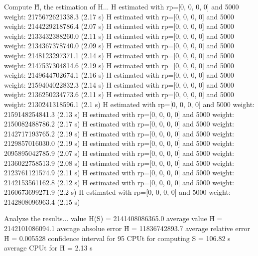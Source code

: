 Compute H̃, the estimation of H...
  H estimated with rp=[0, 0, 0, 0] and 5000 weight:  2175672621338.3  (2.17 s)
  H estimated with rp=[0, 0, 0, 0] and 5000 weight:  2144229218786.4  (2.07 s)
  H estimated with rp=[0, 0, 0, 0] and 5000 weight:  2133432388260.0  (2.11 s)
  H estimated with rp=[0, 0, 0, 0] and 5000 weight:  2134367378740.0  (2.09 s)
  H estimated with rp=[0, 0, 0, 0] and 5000 weight:  2148123297371.1  (2.14 s)
  H estimated with rp=[0, 0, 0, 0] and 5000 weight:  2147537304814.6  (2.19 s)
  H estimated with rp=[0, 0, 0, 0] and 5000 weight:  2149644702674.1  (2.16 s)
  H estimated with rp=[0, 0, 0, 0] and 5000 weight:  2159404022832.3  (2.14 s)
  H estimated with rp=[0, 0, 0, 0] and 5000 weight:  2136250234773.6  (2.11 s)
  H estimated with rp=[0, 0, 0, 0] and 5000 weight:  2130241318596.1  (2.1 s)
  H estimated with rp=[0, 0, 0, 0] and 5000 weight:  2159148254841.3  (2.13 s)
  H estimated with rp=[0, 0, 0, 0] and 5000 weight:  2150082488786.2  (2.17 s)
  H estimated with rp=[0, 0, 0, 0] and 5000 weight:  2142717193765.2  (2.19 s)
  H estimated with rp=[0, 0, 0, 0] and 5000 weight:  2129857016030.0  (2.19 s)
  H estimated with rp=[0, 0, 0, 0] and 5000 weight:  2095895042785.9  (2.07 s)
  H estimated with rp=[0, 0, 0, 0] and 5000 weight:  2136022758513.9  (2.08 s)
  H estimated with rp=[0, 0, 0, 0] and 5000 weight:  2123761121574.9  (2.11 s)
  H estimated with rp=[0, 0, 0, 0] and 5000 weight:  2142153561162.8  (2.12 s)
  H estimated with rp=[0, 0, 0, 0] and 5000 weight:  2160673699271.9  (2.2 s)
  H estimated with rp=[0, 0, 0, 0] and 5000 weight:  2142808096963.4  (2.15 s)

Analyze the results...
  value H(S)                  = 2141408086365.0 
  average value H̃             = 2142101086094.1 
  average absolue error H̃     = 11836742893.7 
  average relative error H̃    = 0.005528 
  confidence interval for 95%
  CPUt for computing S         = 106.82 s
  average CPUt for H̃           = 2.13 s

